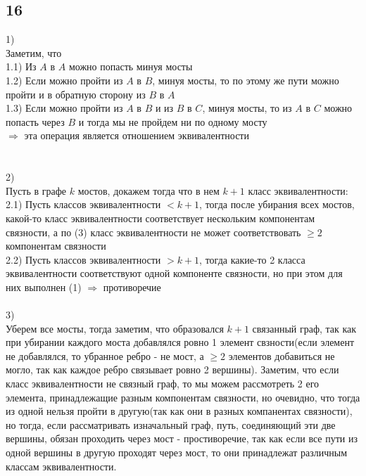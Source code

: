 		\subsection{16}
		1)\\
		Заметим, что\\
		1.1) Из $A$ в $A$ можно попасть минуя мосты\\
		1.2) Если можно пройти из $A$ в $B$, минуя мосты, то по этому же пути можно пройти и в обратную сторону из $B$ в $A$\\
		1.3) Если можно пройти из $A$ в $B$ и из $B$ в $C$, минуя мосты, то из $A$ в $C$ можно попасть через $B$ и тогда мы не пройдем ни по одному мосту\\
		$\Longrightarrow$ эта операция является отношением эквивалентности\\
		\\ \\
		2)\\
		Пусть в графе $k$ мостов, докажем тогда что в нем $k+1$ класс эквивалентности:\\
		2.1) Пусть классов эквивалентности $< k+1$, тогда после убирания всех мостов, какой-то класс эквивалентности соответствует нескольким компонентам связности, а по (3) класс эквивалентности не может соответствовать $\geqslant 2$ компонентам связности\\
		2.2) Пусть классов эквивалентности $> k+1$, тогда какие-то 2 класса эквивалентности соответствуют одной компоненте связности, но при этом для них выполнен (1) $\Longrightarrow$ противоречие
		\\ \\
		3)\\
		Уберем все мосты, тогда заметим, что образовался $k+1$ связанный граф, так как при убирании каждого моста добавлялся ровно 1 элемент свзности(если элемент не добавлялся, то убранное ребро - не мост, а $\geqslant 2$ элементов добавиться не могло, так как каждое ребро связывает ровно 2 вершины). Заметим, что если класс эквивалентности не связный граф, то мы можем рассмотреть 2 его элемента, принадлежащие разным компонентам связности, но очевидно, что тогда из одной нельзя пройти в другую(так как они в разных компанентах связности), но тогда, если рассматривать изначальный граф, путь, соединяющий эти две вершины, обязан проходить через мост - простиворечие, так как если все пути из одной вершины в другую проходят через мост, то они принадлежат различным классам эквивалентности.
		\\
